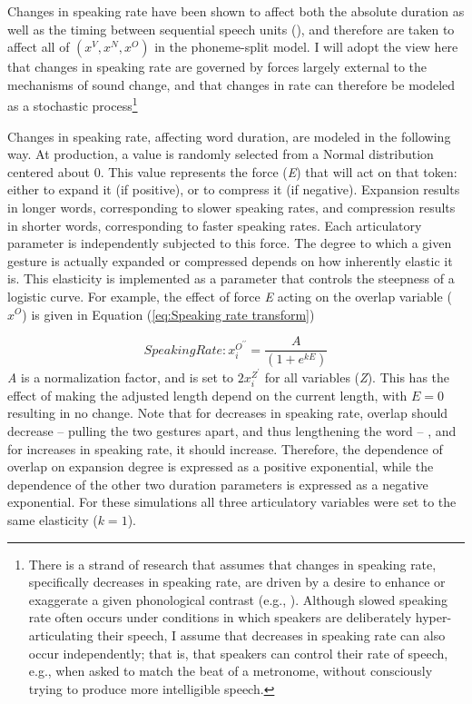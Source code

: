 Changes in speaking rate have been shown to affect both the absolute
duration as well as the timing between sequential speech units (\citealt{stetson1928motor,Hardcastle1985}),
and therefore are taken to affect all of $(x^{V},x^{N},x^{O})$ in
the phoneme-split model. I will adopt the view here that changes in
speaking rate are governed by forces largely external to the mechanisms
of sound change, and that changes in rate can therefore be modeled
as a stochastic process\footnote{There is a strand of research that assumes that changes in speaking
rate, specifically decreases in speaking rate, are driven by a desire
to enhance or exaggerate a given phonological contrast (e.g., \citealt{beckman2011rate}).
Although slowed speaking rate often occurs under conditions in which
speakers are deliberately hyper-articulating their speech, I assume
that decreases in speaking rate can also occur independently; that
is, that speakers can control their rate of speech, e.g., when asked
to match the beat of a metronome, without consciously trying to produce
more intelligible speech.}

Changes in speaking rate, affecting word duration, are modeled in
the following way. At production, a value is randomly selected from
a Normal distribution centered about 0. This value represents the
force (\emph{E}) that will act on that token: either to expand it
(if positive), or to compress it (if negative). Expansion results
in longer words, corresponding to slower speaking rates, and compression
results in shorter words, corresponding to faster speaking rates.
Each articulatory parameter is independently subjected to this force.
The degree to which a given gesture is actually expanded or compressed
depends on how inherently elastic it is. This elasticity is implemented
as a parameter that controls the steepness of a logistic curve. For
example, the effect of force \emph{E} acting on the overlap variable
($x^{O}$) is given in Equation (\ref{eq:Speaking rate transform}) 

\begin{equation}
Speaking\overset{}{}Rate:x_{i}^{O^{\prime\prime}}=\frac{A}{(1+e^{kE})}\label{eq:Speaking rate transform}
\end{equation}
\emph{A} is a normalization factor, and is set to $2x_{i}^{Z^{\prime}}$
for all variables (\emph{Z}). This has the effect of making the adjusted
length depend on the current length, with $E=0$ resulting in no change.
Note that for decreases in speaking rate, overlap should decrease
– pulling the two gestures apart, and thus lengthening the word –
, and for increases in speaking rate, it should increase. Therefore,
the dependence of overlap on expansion degree is expressed as a positive
exponential, while the dependence of the other two duration parameters
is expressed as a negative exponential. For these simulations all
three articulatory variables were set to the same elasticity ($k=1$). 

